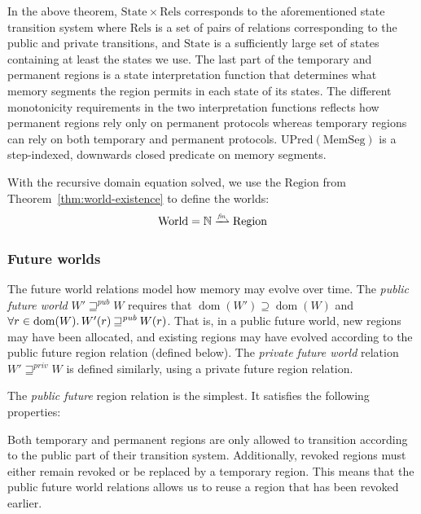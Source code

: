 \documentclass[acmsmall,review]{acmart}\settopmatter{printfolios=true}
\newcommand{\finparfun}{\xrightharpoonup{\textit{\tiny{fin}}}}
\DeclareMathOperator{\dom}{dom}
\newcommand\lau[1]{{\color{purple} \sf \footnotesize {LS: #1}}\\}
\newcommand\dominique[1]{{\color{purple} \sf \footnotesize {DD: #1}}\\}
\newcommand{\var}[1]{\mathit{#1}}
\newcommand{\pub}{\var{pub}}
\newcommand{\futurewk}{\mathbin{\sqsupseteq}^{\var{pub}}}
\newcommand{\futurestr}{\mathbin{\sqsupseteq}^{\var{priv}}}
\newcommand{\plaindom}[1]{\mathrm{#1}}
\newcommand{\HeapSegments}{\plaindom{MemSeg}}
\newcommand{\nats}{\mathbb{N}}
\newcommand{\Rels}{\plaindom{Rels}}
\newcommand{\States}{\plaindom{State}}
\newcommand{\Regions}{\plaindom{Region}}
\newcommand{\Worlds}{\plaindom{World}}
\newcommand{\UPred}[1]{\plaindom{UPred}(#1)}
\newcommand{\plainview}[1]{\mathrm{#1}}
\newcommand{\temp}{\plainview{temp}}
\newcommand{\revoked}{\plainview{revoked}}
\begin{document}
In the above theorem, $\States \times \Rels$ corresponds to the
aforementioned state transition system where $\Rels$ is a set of pairs
of relations corresponding to the public and private transitions, and
$\States$ is a sufficiently large set of states containing at least the
states we use. The last part of the temporary and permanent regions is
a state interpretation function that determines what memory segments
the region permits in each state of its states. The different
monotonicity requirements in the two interpretation functions reflects
how permanent regions rely only on permanent protocols whereas
temporary regions can rely on both temporary and permanent protocols.
$\UPred{\HeapSegments}$ is a step-indexed, downwards closed predicate
on memory segments.

With the recursive domain equation solved, we use the $\Regions$ from
Theorem~\ref{thm:world-existence} to define the worlds:
\[
  \Worlds = \nats \finparfun \Regions
\]

\subsubsection{Future worlds}
\label{subsec:future-worlds} 
The future world relations model how memory may evolve over time. 
The \emph{public future world} $W' \futurewk W$ requires that $\dom(W') \supseteq
\dom(W)$ and $\forall r \in \dom(W) \ldotp W'(r) \futurewk W(r)$. That is, in a
public future world, new regions may have been allocated, and existing regions
may have evolved according to the public future region relation (defined below).
The \emph{private future world} relation $W' \futurestr W$ is defined similarly,
using a private future region relation.

The \emph{public future} region relation is the simplest. It satisfies
the following properties:
Both temporary and permanent regions are only allowed to transition according to
the public part of their transition system. Additionally, revoked regions must
either remain revoked or be replaced by a temporary region. This means that the
public future world relations allows us to reuse a region that has been revoked
earlier.
\end{document}

